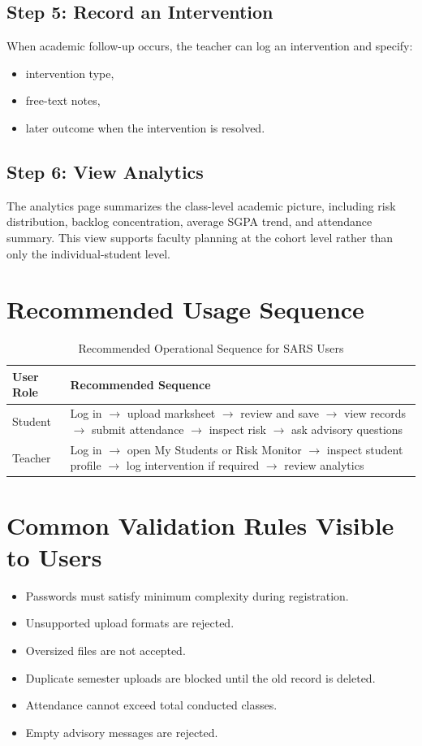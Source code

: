 \subsection{Step 5: Record an Intervention}
When academic follow-up occurs, the teacher can log an intervention and specify:
\begin{itemize}[leftmargin=*]
\item intervention type,
\item free-text notes,
\item later outcome when the intervention is resolved.
\end{itemize}

\subsection{Step 6: View Analytics}
The analytics page summarizes the class-level academic picture, including risk distribution, backlog concentration, average SGPA trend, and attendance summary. This view supports faculty planning at the cohort level rather than only the individual-student level.

\section{Recommended Usage Sequence}
\begin{table}[H]
\centering
\caption{Recommended Operational Sequence for SARS Users}
\begin{tabularx}{\textwidth}{>{\raggedright\arraybackslash}p{} >{\raggedright\arraybackslash}X}
\toprule
\textbf{User Role} & \textbf{Recommended Sequence} \\
\midrule
Student & Log in $\rightarrow$ upload marksheet $\rightarrow$ review and save $\rightarrow$ view records $\rightarrow$ submit attendance $\rightarrow$ inspect risk $\rightarrow$ ask advisory questions \\
Teacher & Log in $\rightarrow$ open My Students or Risk Monitor $\rightarrow$ inspect student profile $\rightarrow$ log intervention if required $\rightarrow$ review analytics \\
\bottomrule
\end{tabularx}
\end{table}

\section{Common Validation Rules Visible to Users}
\begin{itemize}[leftmargin=*]
\item Passwords must satisfy minimum complexity during registration.
\item Unsupported upload formats are rejected.
\item Oversized files are not accepted.
\item Duplicate semester uploads are blocked until the old record is deleted.
\item Attendance cannot exceed total conducted classes.
\item Empty advisory messages are rejected.
\end{itemize}

